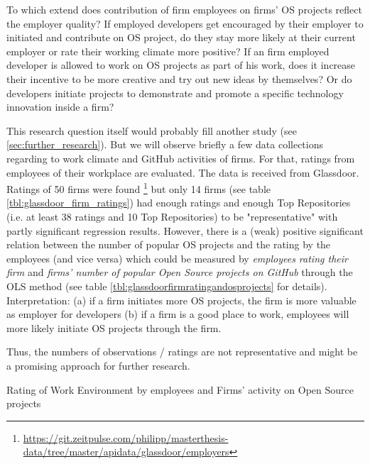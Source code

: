 \label{sec:glassdoor_ratings}

To which extend does contribution of firm employees on firms' OS projects reflect the employer quality? If employed developers get encouraged by their employer to initiated and contribute on OS project, do they stay more likely at their current employer or rate their working climate more positive? If an firm employed developer is allowed to work on OS projects as part of his work, does it increase their incentive to be more creative and try out new ideas by themselves? Or do developers initiate projects to demonstrate and promote a specific technology innovation inside a firm?

This research question itself would probably fill another study (see \ref{sec:further_research}). But we will observe briefly a few data collections regarding to work climate and GitHub activities of firms. For that, ratings from employees of their workplace are evaluated. The data is received from Glassdoor. Ratings of 50 firms were found \footnote{\url{https://git.zeitpulse.com/philipp/masterthesis-data/tree/master/apidata/glassdoor/employers}} but only 14 firms (see table \ref{tbl:glassdoor_firm_ratings}) had enough ratings and enough Top Repositories (i.e. at least 38 ratings and 10 Top Repositories) to be "representative" with partly significant regression results. However, there is a (weak) positive significant relation between the number of popular OS projects and the rating by the employees (and vice versa) which could be measured by \textit{employees rating their firm} and \textit{firms' number of popular Open Source projects on GitHub} through the OLS method (see table \ref{tbl:glassdoorfirmratingandosprojects} for details). Interpretation: (a) if a firm initiates more OS projects, the firm is more valuable as employer for developers (b) if a firm is a good place to work, employees will more likely initiate OS projects through the firm.

Thus, the numbers of observations / ratings are not representative and might be a promising approach for further research.

\begin{table}[!h] \centering
	\scriptsize{
	
	}
	\caption{Rating of Work Environment by employees and Firms' activity on Open Source projects}
  \label{tbl:glassdoorfirmratingandosprojects}
\end{table}

\clearpage

